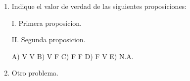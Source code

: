 
\begin{enumerate}
\item Indique el valor de verdad de las siguientes proposiciones:

I. Primera proposicion.

II. Segunda proposicion.

A) V V B) V F C) F F D) F V E) N.A.
\item Otro problema.
\end{enumerate}
